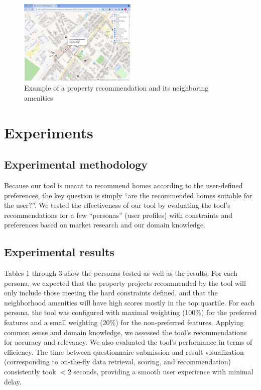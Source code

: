 \documentclass[a4paper, 11pt]{article}
\begin{document}
   \begin{figure}[h]
   \centering
   \includegraphics[width={0.5\textwidth}]{map.png}
   \caption{Example of a property recommendation and its neighboring amenities}
   \end{figure}

\section{Experiments}

\subsection{Experimental methodology}

Because our tool is meant to recommend homes according to the user-defined preferences, the key question is simply “are the recommended homes suitable for the user?”. We tested the effectiveness of our tool by evaluating the tool's recommendations for a few “personas” (user profiles) with constraints and preferences based on market research and our domain knowledge.

\subsection{Experimental results}

Tables 1 through 3 show the personas tested as well as the results. For each persona, we expected that the property projects recommended by the tool will only include those meeting the hard constraints defined, and that the neighborhood amenities will have high scores mostly in the top quartile. For each persona, the tool was configured with maximal weighting (100\%) for the preferred features and a small weighting (20\%) for the non-preferred features. Applying common sense and domain knowledge, we assessed the tool's recommendations for accuracy and relevancy. We also evaluated the tool's performance in terms of efficiency. The time between questionnaire submission and result visualization (corresponding to on-the-fly data retrieval, scoring, and recommendation) consistently took $<2$ seconds, providing a smooth user experience with minimal delay.
\end{document}
